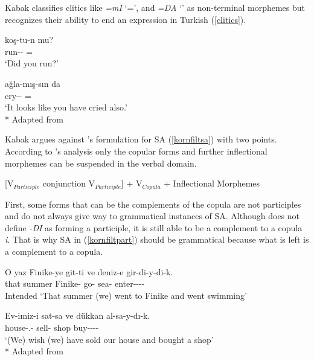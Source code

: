 Kabak classifies clitics like \textit{=mI} `={\Q}', and \textit{=DA} `{\Foc}' as non-terminal morphemes but recognizes their ability to end an expression in Turkish (\ref{clitics}).

\begin{exe}
    \ex \label{clitics}

    \begin{xlist}
        \ex \gll koş-tu-n mu? \\ 
        run-{{\Pst}}-{\Second}{\Sg} ={\Q} \\
        \glt `Did you run?'
  
        \ex \gll ağla-mış-sın da \\ cry-{\Evi}-{\Second}{\Sg} ={\Foc} \\ 
        \glt `It looks like you have cried also.'\\*
        \hfill Adapted from \cite{kabak2007turkish}
    \end{xlist}
\end{exe}

Kabak argues against \cite{kornfilt1996some}'s formulation for SA (\ref{kornfiltsa}) with two points. According to \cite{kornfilt1996some}'s analysis only the copular forms and further inflectional morphemes can be suspended in the verbal domain.
\begin{exe}
    \ex \label{kornfiltsa}
    [V$_{Participle}$ conjunction V$_{Participle}$] + V$_{Copula}$ + Inflectional Morphemes
\end{exe}

First, some forms that can be the complements of the copula are not participles and do not always give way to grammatical instances of SA. Although \cite{kornfilt1996some} does not define \textit{-DI} as forming a participle, it is still able to be a complement to a copula \textit{i}. That is why SA in (\ref{kornfiltpart}) should be grammatical because what is left is a complement to a copula.

\begin{exe}
    \ex \label{kornfiltpart}
    \begin{xlist}
        \ex \gll *O yaz Finike-ye git-ti ve deniz-e gir-di-y-di-k. \\ 
        that summer Finike-{\Dat} go-{{\Pst}} {\And} sea-{\Dat} enter-{{\Pst}}-{\Cop}-{{\Pst}}-{\Fpl} \\
        \glt Intended `That summer (we) went to Finike and went swimming'
        
        \ex \gll *Ev-imiz-i sat-sa ve dükkan al-sa-y-dı-k. \\ 
        house-{\Poss}.{\Fpl}-{\Acc} sell-{\Cond} {\And} shop buy-{\Cond}-{\Cop}-{{\Pst}}-{\Fpl} \\
        \glt `(We) wish (we) have sold our house and bought a shop'\\*
        \hfill Adapted from \cite{kabak2007turkish}
    \end{xlist}
\end{exe}

